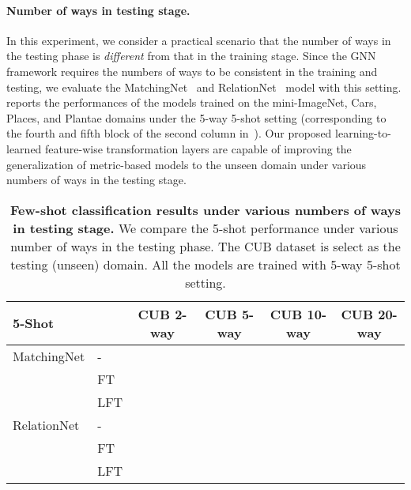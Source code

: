 \paragraph{Number of ways in testing stage.}
In this experiment, we consider a practical scenario that the number of ways  in the testing phase is \emph{different} from that in the training stage.
Since the GNN~\citep{garcia2018gnn} framework requires the numbers of ways to be consistent in the training and testing, we evaluate the MatchingNet~\citep{vinyals2016matching} and RelationNet~\citep{sung2018learning} model with this setting.
 reports the performances of the models trained on the mini-ImageNet, Cars, Places, and Plantae domains under the 5-way 5-shot setting (\ie corresponding to the fourth and fifth block of the second column in~). 
Our proposed learning-to-learned feature-wise transformation layers are capable of improving the generalization of metric-based models to the unseen domain under various numbers of ways in the testing stage.

\begin{table}[t]\footnotesize
	\centering
	\caption{\textbf{Few-shot classification results under various numbers of ways in testing stage.} We compare the 5-shot performance under various number of ways in the testing phase. The CUB dataset is select as the testing (unseen) domain. All the models are trained with 5-way 5-shot setting.}
	\begin{tabular}{l l cccc} 
	    \toprule
	    5-Shot &  & CUB 2-way & CUB 5-way & CUB 10-way & CUB 20-way \\
		\midrule
		MatchingNet & - &
		 &  &  &  \\
		 & FT &
		 &  &  & \\
		 & LFT & 
		 &  &  & \\
		\midrule
		RelationNet & - &
		 &  &  &  \\
		& FT &
		 &  &  &  \\
		& LFT & 
		 &  &  & \\ 
		\bottomrule 
	\end{tabular}
	\label{tab:nway}
\end{table}


